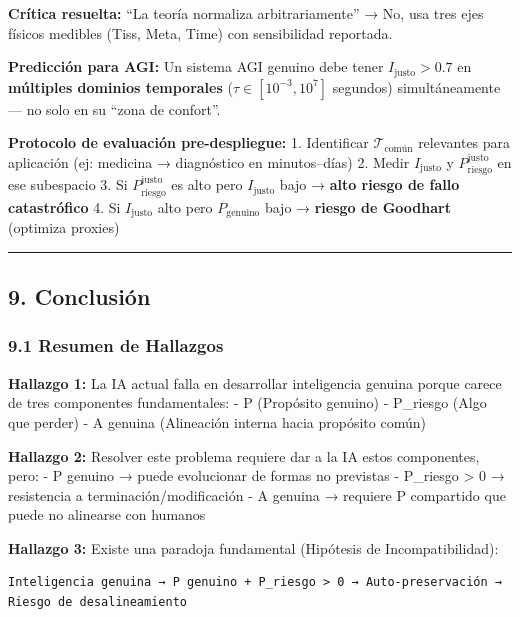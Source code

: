 \textbf{Crítica resuelta:} ``La teoría normaliza arbitrariamente'' → No,
usa tres ejes físicos medibles (Tiss, Meta, Time) con sensibilidad
reportada.

\textbf{Predicción para AGI:} Un sistema AGI genuino debe tener
\(I_{\text{justo}} > 0.7\) en \textbf{múltiples dominios temporales}
(\(\tau \in [10^{-3}, 10^7]\) segundos) simultáneamente --- no solo en
su ``zona de confort''.

\textbf{Protocolo de evaluación pre-despliegue:} 1. Identificar
\(\mathcal{T}_{\text{común}}\) relevantes para aplicación (ej: medicina
→ diagnóstico en minutos--días) 2. Medir \(I_{\text{justo}}\) y
\(P_{\text{riesgo}}^{\text{justo}}\) en ese subespacio 3. Si
\(P_{\text{riesgo}}^{\text{justo}}\) es alto pero \(I_{\text{justo}}\)
bajo → \textbf{alto riesgo de fallo catastrófico} 4. Si
\(I_{\text{justo}}\) alto pero \(P_{\text{genuino}}\) bajo →
\textbf{riesgo de Goodhart} (optimiza proxies)

\begin{center}\rule{0.5\linewidth}{0.5pt}\end{center}

\subsection{9. Conclusión}\label{conclusiuxf3n}

\subsubsection{9.1 Resumen de Hallazgos}\label{resumen-de-hallazgos}

\textbf{Hallazgo 1:} La IA actual falla en desarrollar inteligencia
genuina porque carece de tres componentes fundamentales: - P (Propósito
genuino) - P\_riesgo (Algo que perder) - A genuina (Alineación interna
hacia propósito común)

\textbf{Hallazgo 2:} Resolver este problema requiere dar a la IA estos
componentes, pero: - P genuino → puede evolucionar de formas no
previstas - P\_riesgo \textgreater{} 0 → resistencia a
terminación/modificación - A genuina → requiere P compartido que puede
no alinearse con humanos

\textbf{Hallazgo 3:} Existe una paradoja fundamental (Hipótesis de
Incompatibilidad):

\begin{verbatim}
Inteligencia genuina → P genuino + P_riesgo > 0 → Auto-preservación → Riesgo de desalineamiento
\end{verbatim}

